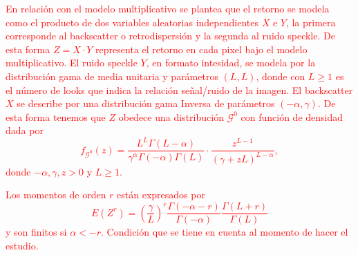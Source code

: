 \documentclass[11pt]{article}
\begin{document}


\textcolor{red}{En  relación con el modelo multiplicativo se plantea que el retorno se modela como el producto de dos variables aleatorias independientes $X$ e $Y$, la primera corresponde al backscatter o retrodispersión y la segunda al ruido speckle. 
De esta forma $Z=X\cdot Y$ representa el retorno en cada pixel bajo el modelo multiplicativo.
El ruido speckle $Y$, en formato intesidad, se modela por la distribución gama de media unitaria y parámetros $(L,L)$, donde con $L\geq 1$ es el número de looks que indica la relación señal/ruido de la imagen. 
El backscatter $X$ se describe por una distribución gama Inversa de parámetros $(-\alpha ,\gamma)$. 
De esta forma tenemos que $Z$ obedece una distribución $\mathcal G^0$ con función de densidad 	dada por
\begin{equation*}
f_{\mathcal{G}^{0}}( z) =\frac{L^{L}\Gamma ( L-\alpha
	) }{\gamma ^{\alpha }\Gamma ( -\alpha ) \Gamma (
	L) }\cdot  
\frac{z^{L-1}}{( \gamma +zL) ^{L-\alpha }},%
\label{ec_dens_gI0}
\end{equation*}
donde $-\alpha,\gamma ,z>0$ y $L\geq 1$.
}

\textcolor{red}{
Los momentos de orden $r$ están expresados por
\begin{equation*}
E\left(Z^{r}\right)=\left(\frac{\gamma}{L}\right)^{r} \frac{\Gamma(-\alpha-r)}{\Gamma(-\alpha)} \frac{\Gamma(L+r)}{\Gamma(L)}
\end{equation*}
y son finitos si $\alpha<-r$. Condición que se tiene en cuenta al momento de hacer el estudio.
}
\end{document}
